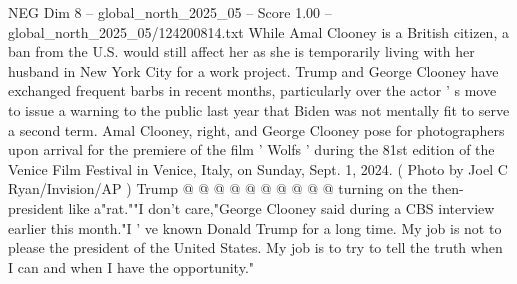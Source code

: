 \begin{textsample}{NEG Dim 8 – global\_north\_2025\_05 – Score 1.00 – global\_north\_2025\_05/124200814.txt}
While Amal Clooney is a British citizen, a ban from the U.S. would still affect her as she is temporarily living with her husband in New York City for a work project.
Trump and George Clooney have exchanged frequent barbs in recent months, particularly over the actor ' s move to issue a warning to the public last year that Biden was not mentally fit to serve a second term.
Amal Clooney, right, and George Clooney pose for photographers upon arrival for the premiere of the film ' Wolfs ' during the 81st edition of the Venice Film Festival in Venice, Italy, on Sunday, Sept. 1, 2024. ( Photo by Joel C Ryan/Invision/AP ) Trump @ @ @ @ @ @ @ @ @ @ turning on the then-president like a"rat.""I don't care,"George Clooney said during a CBS interview earlier this month."I ' ve known Donald Trump for a long time.
My job is not to please the president of the United States.
My job is to try to tell the truth when I can and when I have the opportunity."

\end{textsample}
